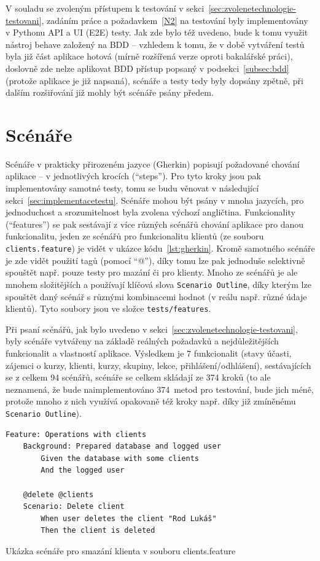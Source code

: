 V souladu se zvoleným přístupem k testování v sekci~\ref{sec:zvolenetechnologie-testovani}, zadáním práce a požadavkem~\ref{N2} na testování byly implementovány v Pythonu API a UI (E2E) testy. Jak zde bylo též uvedeno, bude k tomu využit nástroj behave založený na BDD -- vzhledem k tomu, že v době vytváření testů byla již část aplikace hotová (mírně rozšířená verze oproti bakalářské práci), doslovně zde nelze aplikovat BDD přístup popsaný v podsekci~\ref{subsec:bdd} (protože aplikace je již napsaná), scénáře a testy tedy byly dopsány zpětně, při dalším rozšiřování již mohly být scénáře psány předem.

\section{Scénáře}

Scénáře v prakticky přirozeném jazyce (Gherkin) popisují požadované chování aplikace -- v jednotlivých krocích (\enquote{steps}). Pro tyto kroky jsou pak implementovány samotné testy, tomu se budu věnovat v následující sekci~\ref{sec:implementacetestu}. Scénáře mohou být psány v mnoha jazycích, pro jednoduchost a srozumitelnost byla zvolena výchozí angličtina. Funkcionality (\enquote{features}) se pak sestávají z více různých scénářů chování aplikace pro danou funkcionalitu, jeden ze scénářů pro funkcionalitu klientů (ze souboru \verb|clients.feature|) je vidět v ukázce kódu~\ref{lst:gherkin}. Kromě samotného scénáře je zde vidět použití tagů (pomocí \enquote{@}), díky tomu lze pak jednoduše selektivně spouštět např. pouze testy pro mazání či pro klienty. Mnoho ze scénářů je ale mnohem složitějších a používají klíčová slova \verb|Scenario Outline|, díky kterým lze spouštět daný scénář s různými kombinacemi hodnot (v reálu např. různé údaje klientů). Tyto soubory jsou ve složce \verb|tests/features|.

Při psaní scénářů, jak bylo uvedeno v sekci~\ref{sec:zvolenetechnologie-testovani}, byly scénáře vytvářeny na základě reálných požadavků a nejdůležitějších funkcionalit a vlastností aplikace. Výsledkem je 7 funkcionalit (stavy účasti, zájemci o kurzy, klienti, kurzy, skupiny, lekce, přihlášení/odhlášení), sestávajících se z celkem 94 scénářů, scénáře se celkem skládají ze 374 kroků (to ale neznamená, že bude naimplementováno 374~metod pro testování, bude jich méně, protože mnoho z nich využívá opakovaně též kroky např. díky již zmíněnému \verb|Scenario Outline|).

\begin{listing}[ht]
	\begin{verbatim}
Feature: Operations with clients
    Background: Prepared database and logged user
        Given the database with some clients
        And the logged user
        
    @delete @clients
    Scenario: Delete client
        When user deletes the client "Rod Lukáš"
        Then the client is deleted
	\end{verbatim}
	\caption{Ukázka scénáře pro smazání klienta v souboru clients.feature}\label{lst:gherkin}
\end{listing}

